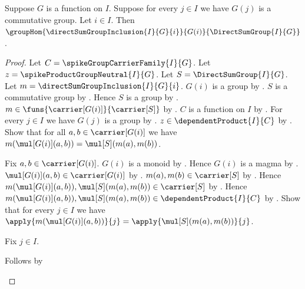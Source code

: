 \begin{theorem}\label{spike_direct_sum_group_inclusion_hom}
    Suppose $G$ is a function on $I$.
    Suppose for every $j\in I$ we have $G(j)$ is a commutative group.
    Let $i\in I$.
    Then
        $\groupHom
            {\directSumGroupInclusion{I}{G}{i}}
            {G(i)}{\DirectSumGroup{I}{G}}$.
\end{theorem}
\begin{proof}
    Let $C=\spikeGroupCarrierFamily{I}{G}$.
    Let $z=\spikeProductGroupNeutral{I}{G}$.
    Let $S=\DirectSumGroup{I}{G}$.
    Let $m=\directSumGroupInclusion{I}{G}{i}$.
    $G(i)$ is a group by
        .
    $S$ is a commutative group by
        .
    Hence $S$ is a group by .
    $m\in\funs{\carrier[G(i)]}{\carrier[S]}$ by
        .
    $C$ is a function on $I$ by
        .
    For every $j\in I$ we have $G(j)$ is a group by
        .
    $z\in\dependentProduct{I}{C}$ by
        .
    Show that for all $a,b\in\carrier[G(i)]$ we have
        $m(\mul[G(i)](a,b))=\mul[S](m(a),m(b))$.
    \begin{subproof}
        Fix $a,b\in\carrier[G(i)]$.
        $G(i)$ is a monoid by .
        Hence $G(i)$ is a magma by .
        $\mul[G(i)](a,b)\in\carrier[G(i)]$ by
            .
        $m(a),m(b)\in\carrier[S]$ by
            .
        Hence $m(\mul[G(i)](a,b)),\mul[S](m(a),m(b))
            \in\carrier[S]$ by
            .
        Hence $m(\mul[G(i)](a,b)),\mul[S](m(a),m(b))
            \in\dependentProduct{I}{C}$ by
            .
        Show that for every $j\in I$ we have
            $\apply{m(\mul[G(i)](a,b))}{j}
                =\apply{\mul[S](m(a),m(b))}{j}$.
        \begin{subproof}
            Fix $j\in I$.
            \begin{byCase}
                Follows by
\end{byCase}
\end{subproof}
\end{subproof}
\end{proof}
